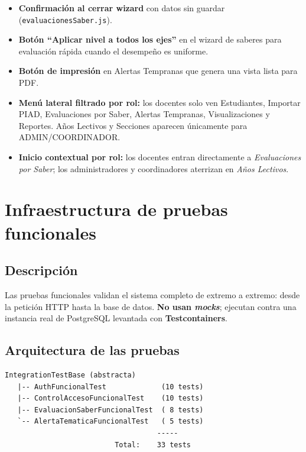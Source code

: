 \documentclass[11pt,a4paper,oneside]{article}
\newcommand{\code}[1]{\texttt{\small #1}}
\begin{document}
\begin{itemize}[leftmargin=*]
  \item \textbf{Confirmación al cerrar wizard} con datos sin guardar
        (\code{evaluacionesSaber.js}).
  \item \textbf{Botón “Aplicar nivel a todos los ejes”} en el wizard de saberes para
        evaluación rápida cuando el desempeño es uniforme.
  \item \textbf{Botón de impresión} en Alertas Tempranas que genera una vista lista para PDF.
  \item \textbf{Menú lateral filtrado por rol:} los docentes solo ven Estudiantes, Importar
        PIAD, Evaluaciones por Saber, Alertas Tempranas, Visualizaciones y Reportes.
        Años Lectivos y Secciones aparecen únicamente para ADMIN/COORDINADOR.
  \item \textbf{Inicio contextual por rol:} los docentes entran directamente a
        \emph{Evaluaciones por Saber}; los administradores y coordinadores aterrizan en
        \emph{Años Lectivos}.
\end{itemize}

\section{Infraestructura de pruebas funcionales}

\subsection{Descripción}

Las pruebas funcionales validan el sistema completo de extremo a extremo: desde la petición
HTTP hasta la base de datos. \textbf{No usan \emph{mocks}}; ejecutan contra una instancia real
de PostgreSQL levantada con \textbf{Testcontainers}.

\subsection{Arquitectura de las pruebas}

\begin{lstlisting}[style=bash,caption={Estructura de las clases de prueba funcional}]
IntegrationTestBase (abstracta)
   |-- AuthFuncionalTest             (10 tests)
   |-- ControlAccesoFuncionalTest    (10 tests)
   |-- EvaluacionSaberFuncionalTest  ( 8 tests)
   `-- AlertaTematicaFuncionalTest   ( 5 tests)
                                    -----
                          Total:    33 tests
\end{lstlisting}
\end{document}
